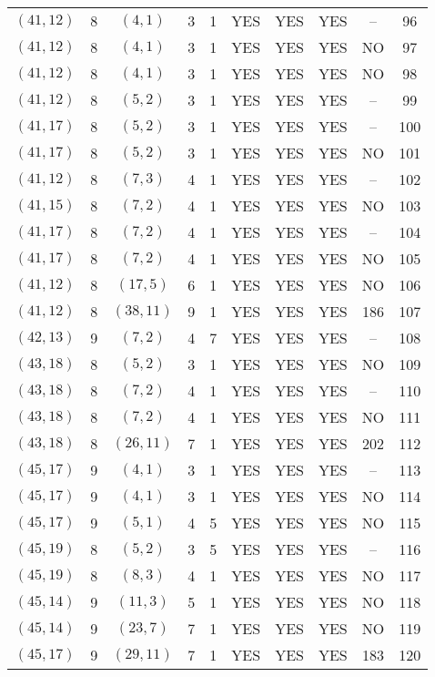 \begin{longtable}{|c|c|c|c|c|c|c|c|c|c|}
$(41, 12)$ & 8 & $(4, 1)$ & 3 & 1 & YES & YES & YES & -- & 96\\
$(41, 12)$ & 8 & $(4, 1)$ & 3 & 1 & YES & YES & YES & NO & 97\\
$(41, 12)$ & 8 & $(4, 1)$ & 3 & 1 & YES & YES & YES & NO & 98\\
$(41, 12)$ & 8 & $(5, 2)$ & 3 & 1 & YES & YES & YES & -- & 99\\
$(41, 17)$ & 8 & $(5, 2)$ & 3 & 1 & YES & YES & YES & -- & 100\\
$(41, 17)$ & 8 & $(5, 2)$ & 3 & 1 & YES & YES & YES & NO & 101\\
$(41, 12)$ & 8 & $(7, 3)$ & 4 & 1 & YES & YES & YES & -- & 102\\
$(41, 15)$ & 8 & $(7, 2)$ & 4 & 1 & YES & YES & YES & NO & 103\\
$(41, 17)$ & 8 & $(7, 2)$ & 4 & 1 & YES & YES & YES & -- & 104\\
$(41, 17)$ & 8 & $(7, 2)$ & 4 & 1 & YES & YES & YES & NO & 105\\
$(41, 12)$ & 8 & $(17, 5)$ & 6 & 1 & YES & YES & YES & NO & 106\\
$(41, 12)$ & 8 & $(38, 11)$ & 9 & 1 & YES & YES & YES & 186 & 107\\
$(42, 13)$ & 9 & $(7, 2)$ & 4 & 7 & YES & YES & YES & -- & 108\\
$(43, 18)$ & 8 & $(5, 2)$ & 3 & 1 & YES & YES & YES & NO & 109\\
$(43, 18)$ & 8 & $(7, 2)$ & 4 & 1 & YES & YES & YES & -- & 110\\
$(43, 18)$ & 8 & $(7, 2)$ & 4 & 1 & YES & YES & YES & NO & 111\\
$(43, 18)$ & 8 & $(26, 11)$ & 7 & 1 & YES & YES & YES & 202 & 112\\
$(45, 17)$ & 9 & $(4, 1)$ & 3 & 1 & YES & YES & YES & -- & 113\\
$(45, 17)$ & 9 & $(4, 1)$ & 3 & 1 & YES & YES & YES & NO & 114\\
$(45, 17)$ & 9 & $(5, 1)$ & 4 & 5 & YES & YES & YES & NO & 115\\
$(45, 19)$ & 8 & $(5, 2)$ & 3 & 5 & YES & YES & YES & -- & 116\\
$(45, 19)$ & 8 & $(8, 3)$ & 4 & 1 & YES & YES & YES & NO & 117\\
$(45, 14)$ & 9 & $(11, 3)$ & 5 & 1 & YES & YES & YES & NO & 118\\
$(45, 14)$ & 9 & $(23, 7)$ & 7 & 1 & YES & YES & YES & NO & 119\\
$(45, 17)$ & 9 & $(29, 11)$ & 7 & 1 & YES & YES & YES & 183 & 120\\

\end{longtable}
